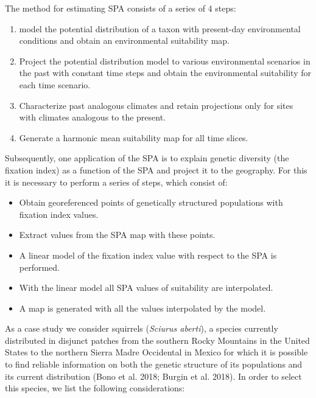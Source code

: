 \documentclass[
]{article}
\providecommand{\tightlist}{%
  \setlength{\itemsep}{0pt}\setlength{\parskip}{0pt}}
\begin{document}
The method for estimating SPA consists of a series of 4 steps:

\begin{enumerate}
\def\labelenumi{\arabic{enumi}.}
\tightlist
\item
  model the potential distribution of a taxon with present-day
  environmental conditions and obtain an environmental suitability map.
\item
  Project the potential distribution model to various environmental
  scenarios in the past with constant time steps and obtain the
  environmental suitability for each time scenario.
\item
  Characterize past analogous climates and retain projections only for
  sites with climates analogous to the present.
\item
  Generate a harmonic mean suitability map for all time slices.
\end{enumerate}

Subsequently, one application of the SPA is to explain genetic diversity
(the fixation index) as a function of the SPA and project it to the
geography. For this it is necessary to perform a series of steps, which
consist of:

\begin{itemize}
\tightlist
\item
  Obtain georeferenced points of genetically structured populations with
  fixation index values.
\item
  Extract values from the SPA map with these points.
\item
  A linear model of the fixation index value with respect to the SPA is
  performed.
\item
  With the linear model all SPA values of suitability are interpolated.
\item
  A map is generated with all the values interpolated by the model.
\end{itemize}

As a case study we consider squirrels (\emph{Sciurus aberti}), a species
currently distributed in disjunct patches from the southern Rocky
Mountains in the United States to the northern Sierra Madre Occidental
in Mexico for which it is possible to find reliable information on both
the genetic structure of its populations and its current distribution
(Bono et al. 2018; Burgin et al. 2018). In order to select this species,
we list the following considerations:
\end{document}
